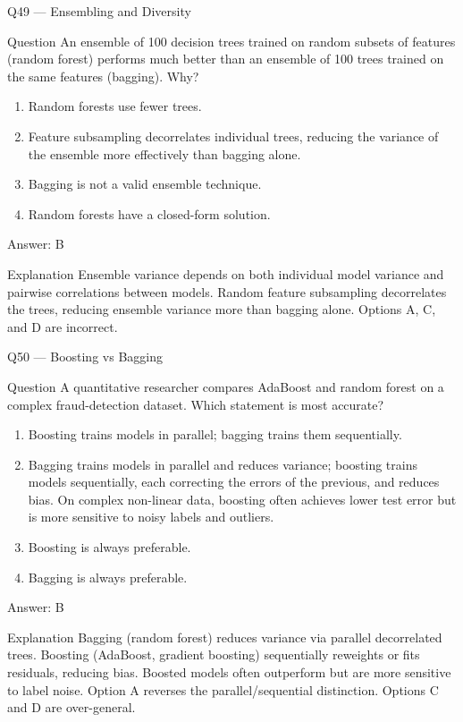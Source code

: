 \documentclass[aspectratio=169,8pt]{beamer}
\begin{document}
	\begin{frame}{Q49 --- Ensembling and Diversity}
		\begin{block}{Question}
			An ensemble of 100 decision trees trained on random subsets of features (random forest) performs much better than an ensemble of 100 trees trained on the same features (bagging). Why?
		\end{block}
		\begin{enumerate}
			\item Random forests use fewer trees.
			\item Feature subsampling decorrelates individual trees, reducing the variance of the ensemble more effectively than bagging alone.
			\item Bagging is not a valid ensemble technique.
			\item Random forests have a closed-form solution.
		\end{enumerate}
		\begin{exampleblock}{Answer: B}\end{exampleblock}
		\begin{block}{Explanation}
			Ensemble variance depends on both individual model variance and pairwise correlations between models. Random feature subsampling decorrelates the trees, reducing ensemble variance more than bagging alone. Options A, C, and D are incorrect.
		\end{block}
	\end{frame}
	
	\begin{frame}{Q50 --- Boosting vs Bagging}
		\begin{block}{Question}
			A quantitative researcher compares AdaBoost and random forest on a complex fraud-detection dataset. Which statement is most accurate?
		\end{block}
		\begin{enumerate}
			\item Boosting trains models in parallel; bagging trains them sequentially.
			\item Bagging trains models in parallel and reduces variance; boosting trains models sequentially, each correcting the errors of the previous, and reduces bias. On complex non-linear data, boosting often achieves lower test error but is more sensitive to noisy labels and outliers.
			\item Boosting is always preferable.
			\item Bagging is always preferable.
		\end{enumerate}
		\begin{exampleblock}{Answer: B}\end{exampleblock}
		\begin{block}{Explanation}
			Bagging (random forest) reduces variance via parallel decorrelated trees. Boosting (AdaBoost, gradient boosting) sequentially reweights or fits residuals, reducing bias. Boosted models often outperform but are more sensitive to label noise. Option A reverses the parallel/sequential distinction. Options C and D are over-general.
		\end{block}
	\end{frame}
	
\end{document}
